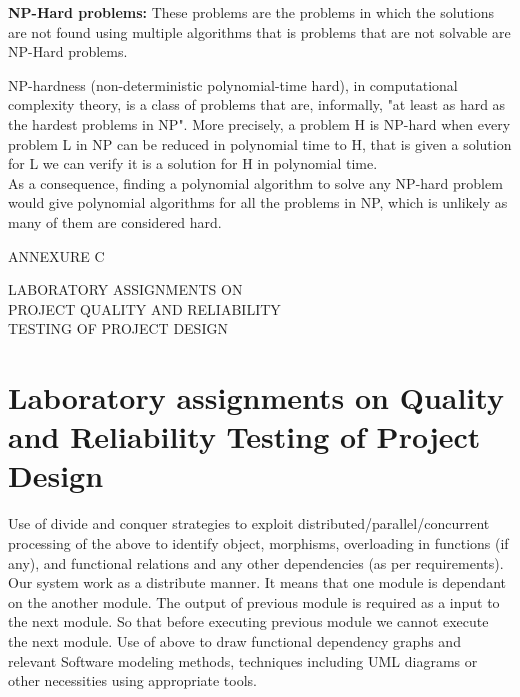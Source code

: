 \documentclass[12pt,a4paper]
{article}
\numberwithin{table}{section}
\begin{document}
{{{{{{{{{\begin{appendices}
\vspace{20pt}

\textbf{NP-Hard problems:} These problems are the problems in which the solutions are not found using multiple algorithms that is problems that are not solvable are NP-Hard problems. 
\\
\par
NP-hardness (non-deterministic polynomial-time hard), in computational complexity theory, is a class of problems that are, informally, "at least as hard as the hardest problems in NP". More precisely, a problem H is NP-hard when every problem L in NP can be reduced in polynomial time to H, that is given a solution for L we can verify it is a solution for H in polynomial time.
\\
As a consequence, finding a polynomial algorithm to solve any NP-hard problem would give polynomial algorithms for all the problems in NP, which is unlikely as many of them are considered hard.\\

\newpage
\begin{minipage}{18cm}
\vspace{4 in}
 \begin{center} 
\begin{Huge}

ANNEXURE C

\vspace{0.5 in}
\setlength{\baselineskip}{1\baselineskip}
LABORATORY ASSIGNMENTS ON \\
PROJECT QUALITY AND RELIABILITY \\
TESTING OF PROJECT DESIGN \\
\end{Huge}

\end{center}
\end{minipage}

\newpage

\section{Laboratory assignments on Quality and Reliability Testing of Project Design}


 Use of divide and conquer strategies to exploit distributed/parallel/concurrent processing of the above to identify object, morphisms, overloading in functions (if any), and functional relations and any other dependencies (as per requirements).
            Our system work as a distribute manner. It means that one module is dependant on the another module. The output of previous module is required as a input to the next module. So that before executing previous  module we cannot execute the next module.
 Use of above to draw functional dependency graphs and relevant Software modeling methods, techniques including UML diagrams or other necessities using appropriate tools.
 \vspace{20 pt}
 

\end{appendices}}}}}}}}}}
\end{document}
